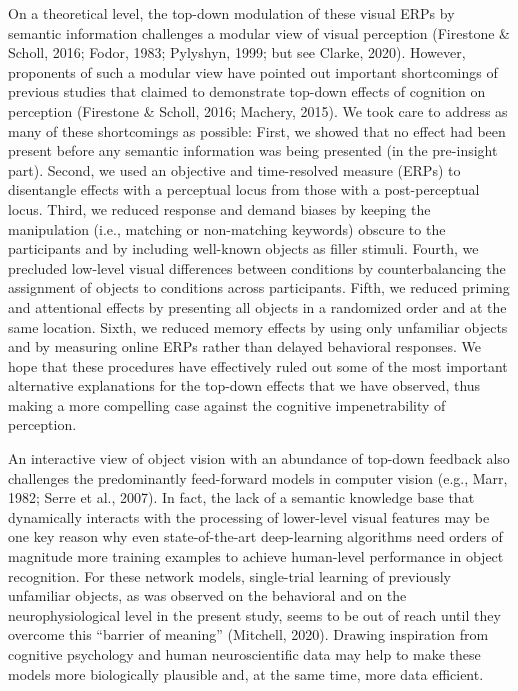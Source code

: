 \documentclass[
  english,
  man,floatsintext]{apa7}
\begin{document}
On a theoretical level, the top-down modulation of these visual ERPs by semantic information challenges a modular view of visual perception (Firestone \& Scholl, 2016; Fodor, 1983; Pylyshyn, 1999; but see Clarke, 2020). However, proponents of such a modular view have pointed out important shortcomings of previous studies that claimed to demonstrate top-down effects of cognition on perception (Firestone \& Scholl, 2016; Machery, 2015). We took care to address as many of these shortcomings as possible: First, we showed that no effect had been present before any semantic information was being presented (in the pre-insight part). Second, we used an objective and time-resolved measure (ERPs) to disentangle effects with a perceptual locus from those with a post-perceptual locus. Third, we reduced response and demand biases by keeping the manipulation (i.e., matching or non-matching keywords) obscure to the participants and by including well-known objects as filler stimuli. Fourth, we precluded low-level visual differences between conditions by counterbalancing the assignment of objects to conditions across participants. Fifth, we reduced priming and attentional effects by presenting all objects in a randomized order and at the same location. Sixth, we reduced memory effects by using only unfamiliar objects and by measuring online ERPs rather than delayed behavioral responses. We hope that these procedures have effectively ruled out some of the most important alternative explanations for the top-down effects that we have observed, thus making a more compelling case against the cognitive impenetrability of perception.

An interactive view of object vision with an abundance of top-down feedback also challenges the predominantly feed-forward models in computer vision (e.g., Marr, 1982; Serre et al., 2007). In fact, the lack of a semantic knowledge base that dynamically interacts with the processing of lower-level visual features may be one key reason why even state-of-the-art deep-learning algorithms need orders of magnitude more training examples to achieve human-level performance in object recognition. For these network models, single-trial learning of previously unfamiliar objects, as was observed on the behavioral and on the neurophysiological level in the present study, seems to be out of reach until they overcome this ``barrier of meaning'' (Mitchell, 2020). Drawing inspiration from cognitive psychology and human neuroscientific data may help to make these models more biologically plausible and, at the same time, more data efficient.
\end{document}
